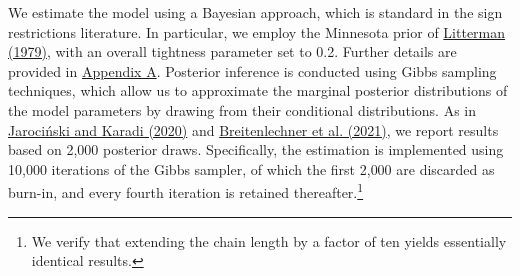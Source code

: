 \documentclass[\latexroot/\projectname]{subfiles}
\begin{document}
We estimate the model using a Bayesian approach, which is standard in the sign restrictions literature. In particular, we employ the Minnesota prior of \hyperlink{Litterman (1979)}{Litterman (1979)}, with an overall tightness parameter set to 0.2. Further details are provided in \hyperlink{Appendix A}{Appendix A}. Posterior inference is conducted using Gibbs sampling techniques, which allow us to approximate the marginal posterior distributions of the model parameters by drawing from their conditional distributions. As in \hyperlink{JK (2020)}{Jarociński and Karadi (2020)} and \hyperlink{Breitenlechner (2021)}{Breitenlechner et al. (2021)}, we report results based on 2{,}000 posterior draws. Specifically, the estimation is implemented using 10{,}000 iterations of the Gibbs sampler, of which the first 2{,}000 are discarded as burn-in, and every fourth iteration is retained thereafter.\footnote{We verify that extending the chain length by a factor of ten yields essentially identical results.}
\end{document}
